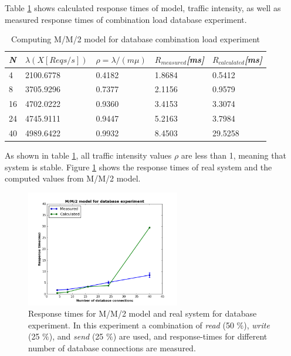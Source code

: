 \documentclass[11pt]{article}
\begin{document}
Table \ref{tbl:mmm-database} shows calculated response times of model, traffic intensity, as well as 
measured response times of combination load database experiment. 
\begin{table}[!ht]
  \begin{tabular}{*5l}    \toprule
  \emph{N} & \emph{$\lambda(X[Reqs/s])$} &  \emph{$\rho=\lambda/(m \mu)$}  & \emph{$R_{measured}$[ms]} & \emph{$R_{calculated}$[ms]}\\\midrule
4   & 2100.6778 & 0.4182  & 1.8684 & 0.5412 \\
8   & 3705.9296 & 0.7377  & 2.1156 & 0.9579 \\ 
16  & 4702.0222 & 0.9360  & 3.4153 & 3.3074 \\
24  & 4745.9111 & 0.9447  & 5.2163 & 3.7984 \\
40  & 4989.6422 & 0.9932  & 8.4503 & 29.5258 \\
\hline
  \end{tabular}
  \centering
  \caption{Computing M/M/2 model for database combination load experiment}
  \label{tbl:mmm-database}
\end{table}

As shown in table \ref{tbl:mmm-database}, all traffic intensity values $\rho$ are less than 1, meaning that 
system is stable. Figure \ref{fig:mmm-database} shows the response times of real system and the 
computed values from M/M/2 model.
\begin{figure}[H]
  \includegraphics[width=0.6\textwidth,page=1]{figures/mmm/mmm-database}
  \centering
  \caption{Response times for M/M/2 model and real system for database experiment. In this experiment a 
   combination of \emph{read} (50 $\%$), \emph{write} (25 $\%$), and \emph{send} (25 $\%$) are used, 
   and response-times for  different number of database connections are measured.}
  \label{fig:mmm-database}
\end{figure}
\end{document}

